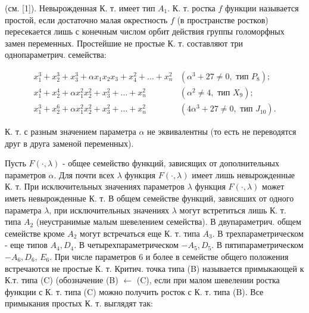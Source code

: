 \documentclass[10pt]{article}
\begin{document}
(см. [1]). Невырожденная К. т. имеет тип $A_{1}$. К. т. ростка $f$ функции называется простой, если достаточно малая окрестность $f$ (в пространстве ростков) пересекается лишь с конечным числом орбит действия группы голоморфных замен переменных. Простейшие не простые К. т. составляют три однопараметрич. семейства:



\[

\begin{array}{lr}

x_{1}^{3}+x_{2}^{3}+x_{3}^{3}+\alpha x_{1} x_{2} x_{3}+x_{4}^{2}+\ldots+x_{n}^{2} & \left(\alpha^{3}+27 \neq 0, \text { тип } P_{8}\right) ; \\

x_{1}^{4}+x_{2}^{4}+\alpha x_{1}^{2} x_{2}^{2}+x_{3}^{2}+\ldots+x_{n}^{2} & \left(\alpha^{2} \neq 4, \text { тип } X_{9}\right) ; \\

x_{1}^{3}+x_{2}^{6}+\alpha x_{1}^{2} x_{2}^{2}+x_{3}^{2}+\ldots+x_{n}^{2} & \left(4 \alpha^{3}+27 \neq 0, \text { тип } J_{10}\right) .

\end{array}

\]



К. т. с разным значением параметра $\alpha$ не эквивалентны (то есть не переводятся друг в друга заменой переменных).



Пусть $F(\cdot, \lambda)$ - общее семейство функций, зависящих от дополнительных параметров $\alpha$. Для почти всех $\lambda$ функция $F(\cdot, \lambda)$ имеет лишь невырожденные К. т. При исключительных значениях параметров $\lambda$ функция $F(\cdot, \lambda)$ может иметь невырожденные К. т. В общем семействе функций, зависяших от одного параметра $\lambda$, при исключительных значениях $\lambda$ могут встретиться лишь К. т. типа $A_{2}$ (неустранимые малым шевелением семейства). В двупараметрич. общем семействе кроме $A_{2}$ могут встречаться еще К. т. типа $A_{3}$. В трехпараметрическом - еще типов $A_{4}, D_{4}$. В четырехпараметрическом $-A_{5}, D_{5}$. В пятипараметрическом $-A_{6}, D_{6}$, $E_{6}$. При числе параметров 6 и более в семействе общего положения встречаются не простые К. т. Критич. точка типа (B) называется примыкающей к К.т. типа (C) (обозначение (B) $\leftarrow$ (C), если при малом шевелении ростка функции с К. т. типа (C) можно получить росток с К. т. типа (B). Все примыкания простых К. т. выглядят так:
\end{document}
